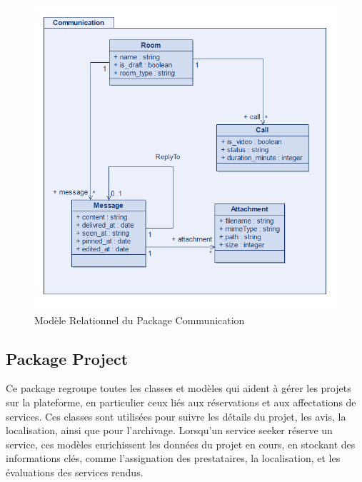 \begin{figure}[H]
\begin{center}
\includegraphics[width=15cm]{assets/diagrams/CommunicationPackage.png}
\end{center}
\caption{Modèle Relationnel du Package Communication}
\end{figure}
\vspace{0.35cm}

\subsection{Package Project}
Ce package regroupe toutes les classes et modèles qui aident à gérer les projets sur la plateforme, en particulier ceux liés aux réservations et aux affectations de services. Ces classes sont utilisées pour suivre les détails du projet, les avis, la localisation, ainsi que pour l'archivage. Lorsqu'un service seeker réserve un service, ces modèles enrichissent les données du projet en cours, en stockant des informations clés, comme l'assignation des prestataires, la localisation, et les évaluations des services rendus.

\vspace{0.35cm}

